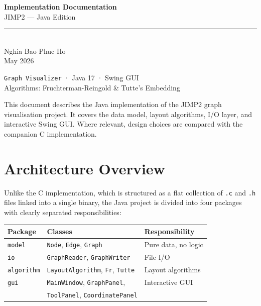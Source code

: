 \documentclass[12pt,a4paper]{article}
\begin{document}
\begin{titlepage}
  \centering
  \vspace*{3cm}
  {\Huge\bfseries\color{accent} Implementation Documentation}\\[0.8em]
  {\Large JIMP2 — Java Edition}\\[2em]
  \rule{0.6\textwidth}{1pt}\\[2em]
  {\large Nghia Bao Phuc Ho}\\[0.5em]
  {\normalsize May 2026}\\[3em]
  \begin{mdframed}[backgroundcolor=codebg,linecolor=coderule]
    \centering
    \texttt{Graph Visualizer} · Java 17 · Swing GUI\\[0.3em]
    Algorithms: Fruchterman-Reingold \& Tutte's Embedding
  \end{mdframed}
  \vfill
  {\small
    This document describes the Java implementation of the JIMP2 graph
    visualisation project. It covers the data model, layout algorithms,
    I/O layer, and interactive Swing GUI. Where relevant, design choices
    are compared with the companion C implementation.}
\end{titlepage}

\tableofcontents
\newpage

\section{Architecture Overview}

Unlike the C implementation, which is structured as a flat collection of
\texttt{.c} and \texttt{.h} files linked into a single binary, the Java
project is divided into four packages with clearly separated
responsibilities:

\begin{center}
\begin{tabular}{lll}
\toprule
\textbf{Package} & \textbf{Classes} & \textbf{Responsibility} \\
\midrule
\texttt{model}     & \texttt{Node}, \texttt{Edge}, \texttt{Graph}          & Pure data, no logic \\
\texttt{io}        & \texttt{GraphReader}, \texttt{GraphWriter}             & File I/O \\
\texttt{algorithm} & \texttt{LayoutAlgorithm}, \texttt{Fr}, \texttt{Tutte} & Layout algorithms \\
\texttt{gui}       & \texttt{MainWindow}, \texttt{GraphPanel},             & Interactive GUI \\
                   & \texttt{ToolPanel}, \texttt{CoordinatePanel}          & \\
\bottomrule
\end{tabular}
\end{center}
\end{document}
